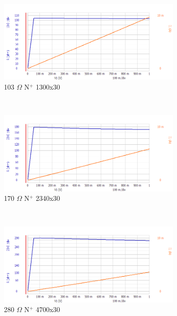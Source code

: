 \documentclass[letter,12pt]{article}
\begin{document}
\begin{figure}[h!]
				~
				\begin{subfigure}[b]{.45\textwidth}
					\includegraphics[width=\textwidth]{./Images/Probe_Test/R_NPlus_1300x30.png}
					\caption{103 $\Omega$ N$^+$ 1300x30}
				\end{subfigure}
				~
				\begin{subfigure}[b]{.45\textwidth}
					\includegraphics[width=\textwidth]{./Images/Probe_Test/R_NPlus_2340x30.png}
					\caption{170 $\Omega$ N$^+$ 2340x30}
				\end{subfigure}
				~
				\begin{subfigure}[b]{.45\textwidth}
					\includegraphics[width=\textwidth]{./Images/Probe_Test/R_NPlus_4700x30.png}
					\caption{280 $\Omega$ N$^+$ 4700x30}
				\end{subfigure}
				~
				\begin{subfigure}[b]{.45\textwidth}

\end{subfigure}
\end{figure}
\end{document}
